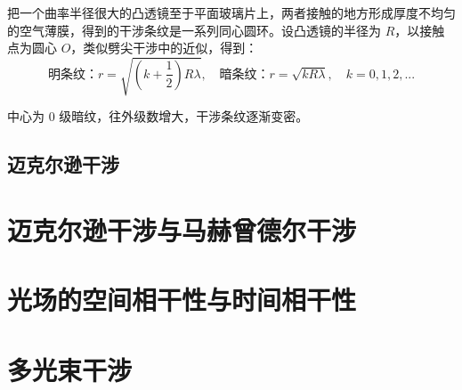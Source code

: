 \documentclass[UTF8]{report}
\theoremstyle{MyLineTheoremStyle} %
\theoremstyle{MyBlockTheoremStyle} %
\theoremstyle{MySubsubsectionStyle} %
\begin{document}
把一个曲率半径很大的凸透镜至于平面玻璃片上，两者接触的地方形成厚度不均匀的空气薄膜，得到的干涉条纹是一系列同心圆环。设凸透镜的半径为 $R$，以接触点为圆心 $O$，类似劈尖干涉中的近似，得到：
\begin{equation}
\text{明条纹：} r = \sqrt{\left(k + \frac{1}{2}\right)R\lambda} 
,\quad 
\text{暗条纹：} r = \sqrt{kR\lambda},\quad k = 0, 1, 2, ...
\end{equation}

中心为 0 级暗纹，往外级数增大，干涉条纹逐渐变密。

\subsection{迈克尔逊干涉}



\section{迈克尔逊干涉与马赫曾德尔干涉}



\section{光场的空间相干性与时间相干性}
\section{多光束干涉}
\end{document}
